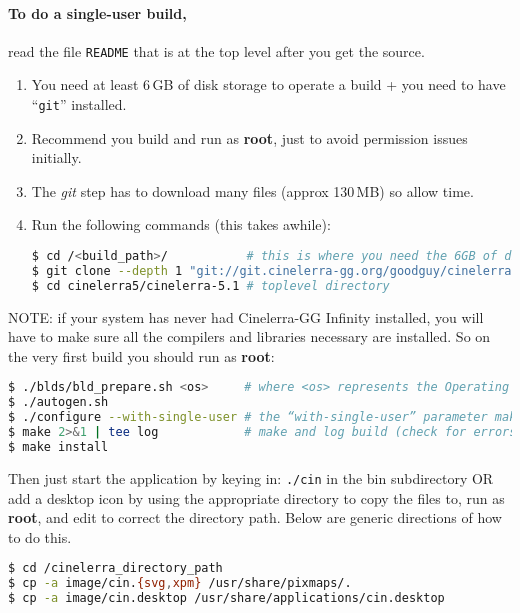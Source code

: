 \paragraph{To do a single-user build,} read the file \texttt{README} that is at the top level after you get the source.
\begin{enumerate}
    \item  You need at least 6\,GB of disk storage to operate a build + you need to have  “\texttt{git}” installed.
    \item  Recommend you build and run as \textbf{root}, just to avoid permission issues initially.
    \item  The \textit{git} step has to download many files (approx 130\,MB) so allow time.
    \item  Run the following commands (this takes awhile):
        \begin{lstlisting}[language=bash,numbers=none]
$ cd /<build_path>/           # this is where you need the 6GB of disk space
$ git clone --depth 1 "git://git.cinelerra-gg.org/goodguy/cinelerra.git" cinelerra5 
$ cd cinelerra5/cinelerra-5.1 # toplevel directory
        \end{lstlisting}
\end{enumerate}

NOTE: if your system has never had Cinelerra-GG Infinity installed, you will have to make sure all
the compilers and libraries necessary are installed. So on the very first build you should run as \textbf{root}:

\begin{lstlisting}[language=bash,numbers=none]
$ ./blds/bld_prepare.sh <os>     # where <os> represents the Operating System of centos, fedora, suse, ubuntu, mint, debian.
$ ./autogen.sh
$ ./configure --with-single-user # the “with-single-user” parameter makes it so
$ make 2>&1 | tee log            # make and log build (check for errors before proceeding)
$ make install
\end{lstlisting}

Then just start the application by keying in: \texttt{./cin} in the bin subdirectory OR add a desktop icon by
using the appropriate directory to copy the files to, run as \textbf{root}, and edit to correct
the directory path.  Below are generic directions of how to do this.

\begin{lstlisting}[language=bash,numbers=none]
$ cd /cinelerra_directory_path
$ cp -a image/cin.{svg,xpm} /usr/share/pixmaps/.
$ cp -a image/cin.desktop /usr/share/applications/cin.desktop
\end{lstlisting}

